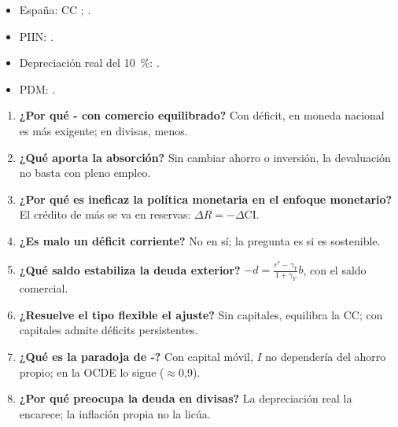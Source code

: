 \documentclass{article}
\begin{document}
\begin{columnas}
\anexorepaso
{}
\begin{itemize}
\item España: CC ; .
\item PIIN: .
\item Depreciación real del 10~\%: .
\item PDM: .
\end{itemize}
\begin{enumerate}
\item \textbf{¿Por qué - con comercio equilibrado?} Con déficit, en moneda nacional es más exigente; en divisas, menos.
\item \textbf{¿Qué aporta la absorción?} Sin cambiar ahorro o inversión, la devaluación no basta con pleno empleo.
\item \textbf{¿Por qué es ineficaz la política monetaria en el enfoque monetario?} El crédito de más se va en reservas: $\Delta R=-\Delta\mathrm{CI}$.
\item \textbf{¿Es malo un déficit corriente?} No en sí; la pregunta es si es sostenible.
\item \textbf{¿Qué saldo estabiliza la deuda exterior?} $-d=\frac{r^*-\gamma_Y}{1+\gamma_Y}b$, con el saldo comercial.
\item \textbf{¿Resuelve el tipo flexible el ajuste?} Sin capitales, equilibra la CC; con capitales admite déficits persistentes.
\item \textbf{¿Qué es la paradoja de -?} Con capital móvil, $I$ no dependería del ahorro propio; en la OCDE lo sigue ($\approx$0,9).
\item \textbf{¿Por qué preocupa la deuda en divisas?} La depreciación real la encarece; la inflación propia no la licúa.

\end{enumerate}
\end{columnas}
\end{document}
